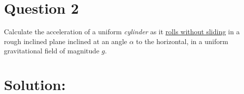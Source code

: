 \section*{Question 2}
Calculate the acceleration of a uniform \textit{cylinder} as it \underline{rolls without sliding} in a rough inclined plane inclined at an angle $\alpha$ to the horizontal, in a uniform gravitational field of magnitude $g$.

\section*{Solution:}